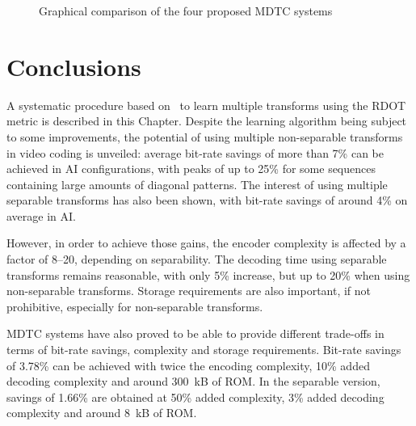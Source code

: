 \documentclass[11pt,a4paper,openright,twoside]{book}
\numberwithin{equation}{section} %
\numberwithin{figure}{section} %
\numberwithin{table}{section} %
\begin{document}
\begin{figure}[tb]
	\def\scale{0.26}
	\def\encmax{2000}
	\def\decmax{130}
	\def\bdrmax{-8}
	\def\rommax{8192}
	\centering
	\def\bdr{-1.66}
	\def\enc{150}
	\def\dec{103}
	\def\rom{8.20}
	\def\bdr{-3.78}
	\def\enc{200}
	\def\dec{110}
	\def\rom{148.75}

	\def\bdr{-4.10}
	\def\enc{800}
	\def\dec{105}
	\def\rom{236.25}
	\def\bdr{-7.10}
	\def\enc{2000}
	\def\dec{120}
	\def\rom{4618.24}
	\caption{Graphical comparison of the four proposed \acs{MDTC} systems}
	\label{fig:four_way_mdtc_comparison_mdtc}
\end{figure}

\section{Conclusions}
\label{sec:mdtc_conclusions}

A systematic procedure based on~\cite{sezer-08-sparse-orthonormal-transforms}
to learn multiple transforms using the \ac{RDOT} metric is described in this
Chapter.
Despite the learning algorithm being subject to some improvements, the
potential of using multiple non-separable transforms in video coding is
unveiled:
average bit-rate savings of more than 7\% can be achieved in \ac{AI}
configurations, with peaks of up to 25\% for some sequences containing large
amounts of diagonal patterns.
The interest of using multiple separable transforms has also been shown, with
bit-rate savings of around 4\% on average in \ac{AI}.

However, in order to achieve those gains, the encoder complexity is affected
by a factor of 8--20, depending on separability.
The decoding time using separable transforms remains reasonable, with only 5\%
increase, but up to 20\% when using non-separable transforms.
Storage requirements are also important, if not prohibitive, especially for
non-separable transforms.

\ac{MDTC} systems have also proved to be able to provide different trade-offs
in terms of bit-rate savings, complexity and storage requirements.
Bit-rate savings of 3.78\% can be achieved with twice the encoding complexity,
10\% added decoding complexity and around \SI{300}{\kilo B} of \acs{ROM}.
In the separable version, savings of 1.66\% are obtained at 50\% added
complexity, 3\% added decoding complexity and around \SI{8}{\kilo B} of
\acs{ROM}.
\end{document}
